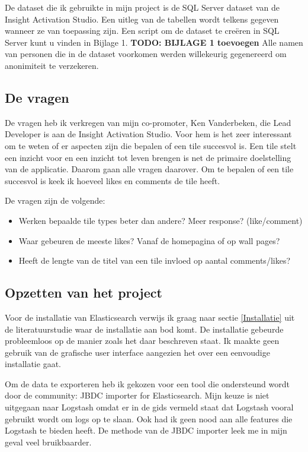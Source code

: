 De dataset die ik gebruikte in mijn project is de SQL Server dataset van de Insight Activation Studio. Een uitleg van de tabellen wordt telkens gegeven wanneer ze van toepassing zijn. Een script om de dataset te creëren in SQL Server kunt u vinden in Bijlage 1. \textbf{TODO: BIJLAGE 1 toevoegen} Alle namen van personen die in de dataset voorkomen werden willekeurig gegenereerd om anonimiteit te verzekeren.

\subsection{De vragen}
De vragen heb ik verkregen van mijn co-promoter, Ken Vanderbeken, die Lead Developer is aan de Insight Activation Studio. Voor hem is het zeer interessant om te weten of er aspecten zijn die bepalen of een tile succesvol is. Een tile stelt een inzicht voor en een inzicht tot leven brengen is net de primaire doelstelling van de applicatie. Daarom gaan alle vragen daarover. Om te bepalen of een tile succesvol is keek ik hoeveel likes en comments de tile heeft.

De vragen zijn de volgende:
\begin{itemize}
	\item Werken bepaalde tile types beter dan andere? Meer response? (like/comment) 
	\item Waar gebeuren de meeste likes? Vanaf de homepagina of op wall pages?
	\item Heeft de lengte van de titel van een tile invloed op aantal comments/likes? 
\end{itemize}

\subsection{Opzetten van het project}

Voor de installatie van Elasticsearch verwijs ik graag naar sectie \ref{Installatie} uit de literatuurstudie waar de installatie aan bod komt. De installatie gebeurde probleemloos op de manier zoals het daar beschreven staat. Ik maakte geen gebruik van de grafische user interface aangezien het over een eenvoudige installatie gaat.

Om de data te exporteren heb ik gekozen voor een tool die ondersteund wordt door de community: JBDC importer for Elasticsearch. Mijn keuze is niet uitgegaan naar Logstash omdat er in de gids vermeld staat dat Logstash vooral gebruikt wordt om logs op te slaan. Ook had ik geen nood aan alle features die Logstash te bieden heeft. De methode van de JBDC importer leek me in mijn geval veel bruikbaarder.

